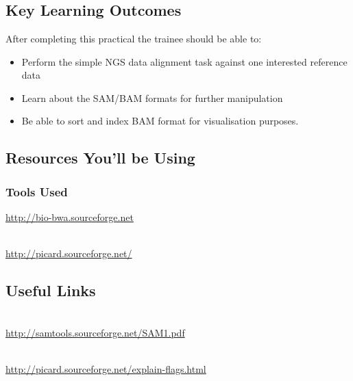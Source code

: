 
\chapter{\moduleTitle}
\newpage

\section{Key Learning Outcomes}

After completing this practical the trainee should be able to:
\begin{itemize}
  \item Perform the simple NGS data alignment task against one interested reference data
  \item Learn about the SAM/BAM formats for further manipulation 
  \item Be able to sort and index BAM format for visualisation purposes.
\end{itemize}

\section{Resources You'll be Using}
 
\subsection{Tools Used}
\begin{description}[style=multiline,labelindent=0cm,align=left,leftmargin=0.5cm]
  	\url{http://bio-bwa.sourceforge.net}
  \item[Samtools]\hfill\\
  	\url{http://picard.sourceforge.net/}
\end{description}

\section{Useful Links}
 
\begin{description}[style=multiline,labelindent=0cm,align=left,leftmargin=0.5cm]
  \item[SAM Specification]\hfill\\
    \url{http://samtools.sourceforge.net/SAM1.pdf}
  \item[Explain SAM Flags]\hfill\\
    \url{http://picard.sourceforge.net/explain-flags.html}
\end{description}

